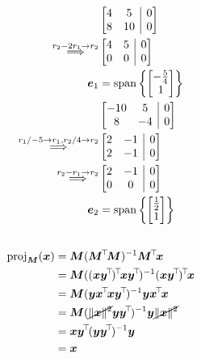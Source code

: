 \documentclass[]{article}
\newcommand{\tpose}[1]{#1^{\! \top} \!}
\begin{document}
\begin{align}
	&\left[\begin{array}{@{}cc|c@{}}
	4 & 5 & 0 \\
	8 & 10 & 0
	\end{array}\right] \\
	\overset{r_2 - 2r_1 \to r_2}{\Longrightarrow}
	&\left[\begin{array}{@{}cc|c@{}}
	4 & 5 & 0 \\
	0 & 0 & 0
	\end{array}\right] \\
	\bm{e}_1 &= \operatorname{span}\left\{\begin{bmatrix}
	-\frac{5}{4} \\
	1
	\end{bmatrix}\right\} \\
	&\left[\begin{array}{@{}cc|c@{}}
	-10 & 5 & 0 \\
	8 & -4 & 0
	\end{array}\right] \\
	\overset{r_1/-5 \to r_1, r_2/4 \to r_2}{\Longrightarrow}
	&\left[\begin{array}{@{}cc|c@{}}
	2 & -1 & 0 \\
	2 & -1 & 0
	\end{array}\right] \\
	\overset{r_2 - r_1 \to r_2}{\Longrightarrow}
	&\left[\begin{array}{@{}cc|c@{}}
	2 & -1 & 0 \\
	0 & 0 & 0
	\end{array}\right] \\
	\bm{e}_2 &= \operatorname{span}\left\{\begin{bmatrix}
	\frac{1}{2} \\
	1
	\end{bmatrix}\right\}
\end{align}

\subsection{}

\begin{align}
	\operatorname{proj}_{\bm{M}}(\bm{x}) &= \bm{M}(\tpose{\bm{M}} \bm{M})^{-1} \tpose{\bm{M}} \bm{x} \\
	&= \bm{M}(\tpose{(\bm{x} \tpose{\bm{y}})} \bm{x} \tpose{\bm{y}})^{-1} \tpose{(\bm{x} \tpose{\bm{y}})} \bm{x} \\
	&= \bm{M}(\bm{y} \tpose{\bm{x}} \bm{x} \tpose{\bm{y}})^{-1} \bm{y} \tpose{\bm{x}} \bm{x} \\
	&= \bm{M}(\cancel{\|\bm{x}\|^2} \bm{y} \tpose{\bm{y}})^{-1} \bm{y} \cancel{\|\bm{x}\|^2} \\
	&= \bm{x}\tpose{\bm{y}}(\bm{y} \tpose{\bm{y}})^{-1}\bm{y} \\
	&= \bm{x}
\end{align}
\end{document}
